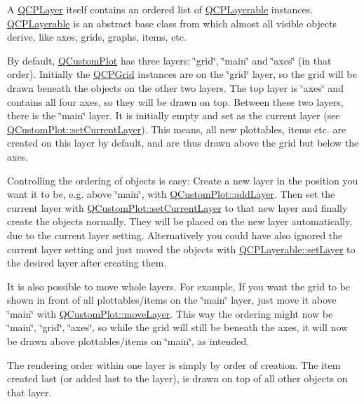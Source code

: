 A \hyperlink{classQCPLayer}{Q\-C\-P\-Layer} itself contains an ordered list of \hyperlink{classQCPLayerable}{Q\-C\-P\-Layerable} instances. \hyperlink{classQCPLayerable}{Q\-C\-P\-Layerable} is an abstract base class from which almost all visible objects derive, like axes, grids, graphs, items, etc.

By default, \hyperlink{classQCustomPlot}{Q\-Custom\-Plot} has three layers\-: \char`\"{}grid\char`\"{}, \char`\"{}main\char`\"{} and \char`\"{}axes\char`\"{} (in that order). Initially the \hyperlink{classQCPGrid}{Q\-C\-P\-Grid} instances are on the \char`\"{}grid\char`\"{} layer, so the grid will be drawn beneath the objects on the other two layers. The top layer is \char`\"{}axes\char`\"{} and contains all four axes, so they will be drawn on top. Between these two layers, there is the \char`\"{}main\char`\"{} layer. It is initially empty and set as the current layer (see \hyperlink{classQCustomPlot_a73a6dc47c653bb6f8f030abca5a11852}{Q\-Custom\-Plot\-::set\-Current\-Layer}). This means, all new plottables, items etc. are created on this layer by default, and are thus drawn above the grid but below the axes.

Controlling the ordering of objects is easy\-: Create a new layer in the position you want it to be, e.\-g. above \char`\"{}main\char`\"{}, with \hyperlink{classQCustomPlot_ad5255393df078448bb6ac83fa5db5f52}{Q\-Custom\-Plot\-::add\-Layer}. Then set the current layer with \hyperlink{classQCustomPlot_a73a6dc47c653bb6f8f030abca5a11852}{Q\-Custom\-Plot\-::set\-Current\-Layer} to that new layer and finally create the objects normally. They will be placed on the new layer automatically, due to the current layer setting. Alternatively you could have also ignored the current layer setting and just moved the objects with \hyperlink{classQCPLayerable_ab0d0da6d2de45a118886d2c8e16d5a54}{Q\-C\-P\-Layerable\-::set\-Layer} to the desired layer after creating them.

It is also possible to move whole layers. For example, If you want the grid to be shown in front of all plottables/items on the \char`\"{}main\char`\"{} layer, just move it above \char`\"{}main\char`\"{} with \hyperlink{classQCustomPlot_ae896140beff19424e9e9e02d6e331104}{Q\-Custom\-Plot\-::move\-Layer}. This way the ordering might now be \char`\"{}main\char`\"{}, \char`\"{}grid\char`\"{}, \char`\"{}axes\char`\"{}, so while the grid will still be beneath the axes, it will now be drawn above plottables/items on \char`\"{}main\char`\"{}, as intended.

The rendering order within one layer is simply by order of creation. The item created last (or added last to the layer), is drawn on top of all other objects on that layer.

